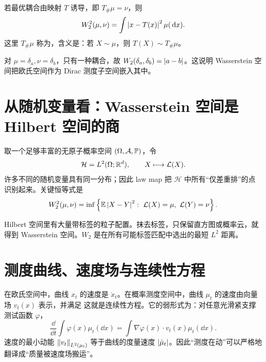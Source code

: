 若最优耦合由映射 $T$ 诱导，即 $T_\#\mu=\nu$，则
\[
W_2^2(\mu,\nu)=\int\left\lvert x-T(x)\right\rvert^2\mu(\,\mathrm{d} x).
\]
这里 $T_\#\mu$ 称为，含义是：若 $X\sim\mu$，则 $T(X)\sim T_\#\mu$。

\begin{examplebox}[两个 Dirac 质量]
对 $\mu=\delta_a,\nu=\delta_b$，只有一种耦合，故 $W_2(\delta_a,\delta_b)=\left\lvert a-b\right\rvert$。这说明 Wasserstein 空间把欧氏空间作为 Dirac 测度子空间嵌入其中。
\end{examplebox}

\section{从随机变量看：Wasserstein 空间是 Hilbert 空间的商}

取一个足够丰富的无原子概率空间 $(\Omega,\mathcal A,\mathbb{P})$，令
\[
\mathcal H=L^2(\Omega;\mathbb{R}^d),\qquad X\longmapsto\mathcal{L}(X).
\]
许多不同的随机变量具有同一分布；因此 law map 把 $\mathcal H$ 中所有“仅差重排”的点识别起来。关键恒等式是
\[
W_2^2(\mu,\nu)
=\inf\left\{\E\abs{X-Y}^2:\ \Law(X)=\mu,\ \Law(Y)=\nu\right\}.
\]

\begin{intuition}[商空间图像]
Hilbert 空间里有大量带标签的粒子配置。抹去标签，只保留直方图或概率云，就得到 Wasserstein 空间。$W_2$ 是在所有可能标签匹配中选出的最短 $L^2$ 距离。
\end{intuition}

\begin{center}
\end{center}

\section{测度曲线、速度场与连续性方程}

在欧氏空间中，曲线 $x_t$ 的速度是 $\dot x_t$。在概率测度空间中，曲线 $\mu_t$ 的速度由向量场 $v_t(x)$ 表示，并满足
这就是连续性方程。它的弱形式为：对任意光滑紧支撑测试函数 $\varphi$，
\[
\frac{\dd}{\dd t}\int\varphi(x)\mu_t(\dd x)
=\int\nabla\varphi(x)\cdot v_t(x)\mu_t(\dd x).
\]
速度的最小动能 $\left\lVert v_t\right\rVert_{L^2(\mu_t)}$ 等于曲线的度量速度 $\left\lvert\dot\mu_t\right\rvert$。因此“测度在动”可以严格地翻译成“质量被速度场搬运”。

